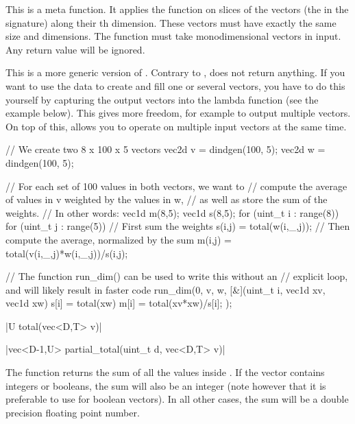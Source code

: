 \begin{advanced}
This is a meta function. It applies the function  on slices of the  vectors (the  in the signature) along their th dimension. These  vectors must have exactly the same size and dimensions. The function  must take  monodimensional vectors in input. Any return value will be ignored.

This is a more generic version of . Contrary to ,  does not return anything. If you want to use the data to create and fill one or several vectors, you have to do this yourself by capturing the output vectors into the lambda function (see the example below). This gives more freedom, for example to output multiple vectors. On top of this,  allows you to operate on multiple input vectors at the same time.

\begin{example}
\begin{cppcode}
// We create two 8 x 100 x 5 vectors
vec2d v = dindgen(100, 5);
vec2d w = dindgen(100, 5);

// For each set of 100 values in both vectors, we want to
// compute the average of values in v weighted by the values in w,
// as well as store the sum of the weights.
// In other words:
vec1d m(8,5);
vec1d s(8,5);
for (uint_t i : range(8))
for (uint_t j : range(5)) {
    // First sum the weights
    s(i,j) = total(w(i,_,j));
    // Then compute the average, normalized by the sum
    m(i,j) = total(v(i,_,j)*w(i,_,j))/s(i,j);
}

// The function run_dim() can be used to write this without an
// explicit loop, and will likely result in faster code
run_dim(0, v, w, [&](uint_t i, vec1d xv, vec1d xw) {
    s[i] = total(xw)
    m[i] = total(xv*xw)/s[i];
});
\end{cppcode}
\end{example}
\end{advanced}

\funcitem \cppinline|U total(vec<D,T> v)| 

\cppinline|vec<D-1,U> partial_total(uint_t d, vec<D,T> v)| 

The function  returns the sum of all the values inside . If the vector contains integers or booleans, the sum will also be an integer (note however that it is preferable to use  for boolean vectors). In all other cases, the sum will be a double precision floating point number.

